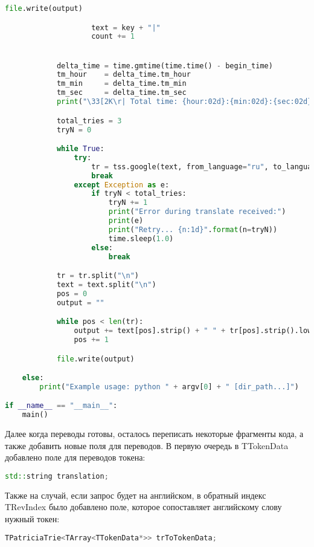 \begin{lstlisting}[language=Python]
                    file.write(output)

                    text = key + "|"
                    count += 1


            delta_time = time.gmtime(time.time() - begin_time)
            tm_hour    = delta_time.tm_hour
            tm_min     = delta_time.tm_min
            tm_sec     = delta_time.tm_sec
            print("\33[2K\r| Total time: {hour:02d}:{min:02d}:{sec:02d} | Translating {n:10d} of {total:10d}...".format(hour=tm_hour, min=tm_min, sec=tm_sec, n=count, total=len(total_tokens)), end="")

            total_tries = 3
            tryN = 0

            while True:
                try:
                    tr = tss.google(text, from_language="ru", to_language="en")
                    break
                except Exception as e:
                    if tryN < total_tries:
                        tryN += 1
                        print("Error during translate received:")
                        print(e)
                        print("Retry... {n:1d}".format(n=tryN))
                        time.sleep(1.0)
                    else:
                        break

            tr = tr.split("\n")
            text = text.split("\n")
            pos = 0
            output = ""

            while pos < len(tr):
                output += text[pos].strip() + " " + tr[pos].strip().lower() + " " + str(value) + "\n"
                pos += 1

            file.write(output)

    else:
        print("Example usage: python " + argv[0] + " [dir_path...]")

if __name__ == "__main__":
    main()
\end{lstlisting}

Далее когда переводы готовы, осталось переписать некоторые фрагменты кода, а также добавить новые поля для переводов. В первую очередь в TTokenData добавлено поле для переводов токена:
\begin{lstlisting}[language=C++]
std::string translation;
\end{lstlisting}

Также на случай, если запрос будет на английском, в обратный индекс TRevIndex было добавлено поле, которое сопоставляет английскому слову нужный токен:
\begin{lstlisting}[language=C++]
TPatriciaTrie<TArray<TTokenData*>> trToTokenData;
\end{lstlisting}

